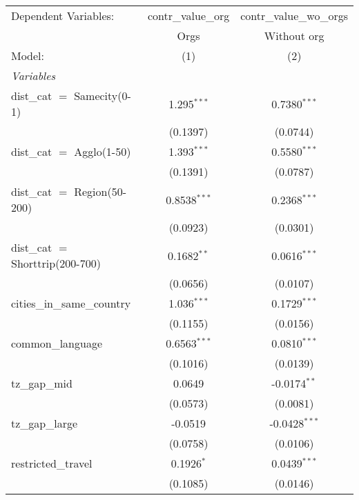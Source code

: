 
\begingroup
\centering
\begin{tabular}{lcc}
   \tabularnewline \midrule \midrule
   Dependent Variables:              & contr\_value\_org   & contr\_value\_wo\_orgs\\     
                                     & Orgs                & Without org \\   
   Model:                            & (1)                 & (2)\\  
   \midrule
   \emph{Variables}\\
   dist\_cat $=$ Samecity(0-1)       & 1.295$^{***}$       & 0.7380$^{***}$\\   
                                     & (0.1397)            & (0.0744)\\   
   dist\_cat $=$ Agglo(1-50)         & 1.393$^{***}$       & 0.5580$^{***}$\\   
                                     & (0.1391)            & (0.0787)\\   
   dist\_cat $=$ Region(50-200)      & 0.8538$^{***}$      & 0.2368$^{***}$\\   
                                     & (0.0923)            & (0.0301)\\   
   dist\_cat $=$ Shorttrip(200-700)  & 0.1682$^{**}$       & 0.0616$^{***}$\\   
                                     & (0.0656)            & (0.0107)\\   
   cities\_in\_same\_country         & 1.036$^{***}$       & 0.1729$^{***}$\\   
                                     & (0.1155)            & (0.0156)\\   
   common\_language                  & 0.6563$^{***}$      & 0.0810$^{***}$\\   
                                     & (0.1016)            & (0.0139)\\   
   tz\_gap\_mid                      & 0.0649              & -0.0174$^{**}$\\   
                                     & (0.0573)            & (0.0081)\\   
   tz\_gap\_large                    & -0.0519             & -0.0428$^{***}$\\   
                                     & (0.0758)            & (0.0106)\\   
   restricted\_travel                & 0.1926$^{*}$        & 0.0439$^{***}$\\   
                                     & (0.1085)            & (0.0146)\\   

\end{tabular}
